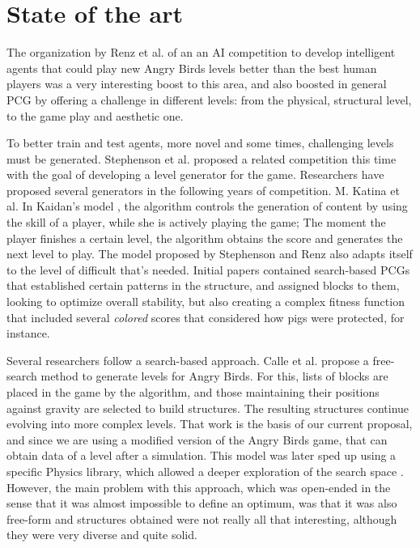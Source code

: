 \documentclass[conference]{IEEEtran}
\begin{document}
\section{State of the art}
\label{SoA} 

The organization by Renz et al. \cite{Renz, Renz2015TheAB}  of an 
an AI competition to develop intelligent agents that could play new  Angry
Birds levels better than the best human players was a very interesting boost to this area, and also boosted in general PCG by offering a challenge in different levels: from the physical, structural level, to the game play and aesthetic one.

To better train and test agents, more
novel and some times, challenging levels must be generated. Stephenson et
al. proposed a related competition \cite{Stephenson2018} this time with the goal of developing a
level generator for the game. Researchers have proposed several generators
in the following years of competition. M. Katina et al. In Kaidan's model \cite{Kaidan2015}, the algorithm controls the generation of content by
using the skill of a player, while she is actively playing the game; The
moment the player finishes a certain level, the algorithm obtains the score
and generates the next level to play. The model proposed by Stephenson and Renz \cite{DBLP:journals/corr/abs-1902-02518} also adapts itself to the level of difficult that's needed. Initial papers \cite{8080448} contained search-based PCGs that established certain patterns in the structure, and assigned blocks to them, looking to optimize overall stability, but also creating a complex fitness function that included several {\em colored} scores that considered how pigs were protected, for instance. 

Several researchers follow a search-based approach.
Calle et al. \cite{lauracalle} propose a free-search method to generate
levels for Angry Birds.  For this, lists of blocks are placed in the game by the algorithm,
and those maintaining their positions against gravity are selected to build
structures. The resulting structures continue evolving into more complex
levels. That work is the basis of our current proposal, and since we are
using a modified version of the Angry Birds game, that can obtain data of a
level after a simulation. This model was later sped up using a specific Physics library, which allowed a deeper exploration of the search space \cite{DBLP:conf/ijcci/CalleGVG19}. However, the main problem with this approach, which was open-ended in the sense that it was almost impossible to define an optimum, was that it was also free-form and structures obtained were not really all that interesting, although they were very diverse and quite solid.
\end{document}
